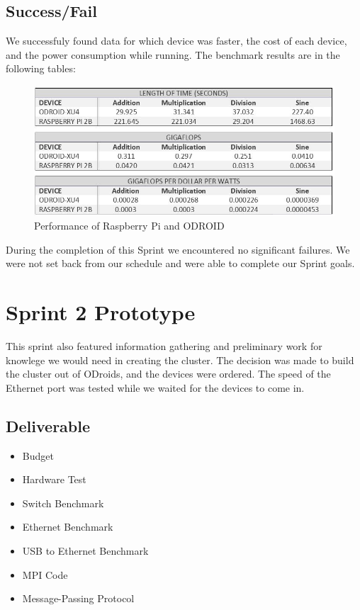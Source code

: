 \subsection{Success/Fail}

We successfuly found data for which device was faster, the cost of each device, and the power consumption while running. The benchmark results are in the following tables:

\begin{figure}[h]
	\caption{Performance of Raspberry Pi and ODROID}
	\centering
		\includegraphics[scale=0.5]{pivsxu4table2.JPG}
\end{figure}

During the completion of this Sprint we encountered no significant failures. We were not set back from our schedule and were able to complete our Sprint goals.

\section{Sprint 2 Prototype}

This sprint also featured information gathering and preliminary work for knowlege we would need in creating the cluster. The decision was made to build the cluster out of ODroids, and the devices were ordered. The speed of the Ethernet port was tested while we waited for the devices to come in.

\subsection{Deliverable}

\begin{itemize}
\item Budget
\item Hardware Test
\item Switch Benchmark
\item Ethernet Benchmark
\item USB to Ethernet Benchmark
\item MPI Code
\item Message-Passing Protocol
\end{itemize}

